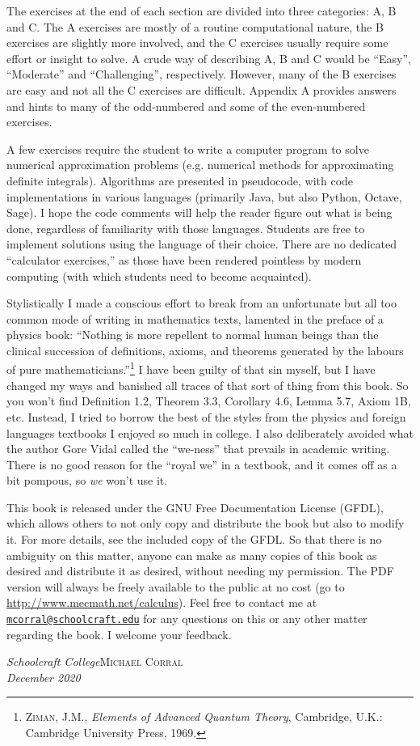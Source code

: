 The exercises at the end of each section are divided into three categories: A, B
and C. The A exercises are mostly of a routine computational nature, the B
exercises are slightly more involved, and the C exercises usually require some
effort or insight to solve. A crude way of describing A, B and C would be
``Easy'', ``Moderate'' and ``Challenging'', respectively. However, many of the B
exercises are easy and not all the C exercises are difficult.  Appendix A
provides answers and hints to many of the odd-numbered and some of the
even-numbered exercises.

A few exercises require the student to write a computer program to solve
numerical approximation problems (e.g. numerical methods for approximating
definite integrals). Algorithms are presented in pseudocode, with code
implementations in various languages (primarily Java, but also Python,
Octave, Sage). I hope the code comments will help the reader figure out what is
being done, regardless of familiarity with those languages. Students are free to
implement solutions using the language of their choice. There are no dedicated
``calculator exercises,'' as those have been rendered pointless by modern
computing (with which students need to become acquainted).

Stylistically I made a conscious effort to break from an unfortunate but all too
common mode of writing in mathematics texts, lamented in the preface of a
physics book: ``Nothing is more repellent to normal human beings than the
clinical succession of definitions, axioms, and theorems generated by the
labours of pure mathematicians.''\footnote{\textsc{Ziman, J.M.},
\emph{Elements of Advanced Quantum Theory}, Cambridge, U.K.: Cambridge
University Press, 1969.} I have been guilty of that sin myself, but I have
changed my ways and banished all traces of that sort of thing from this book. So
you won't find Definition 1.2, Theorem 3.3, Corollary 4.6, Lemma 5.7, Axiom 1B,
etc. Instead, I tried to borrow the best of the styles from the physics and
foreign languages textbooks I enjoyed so much in college. I also deliberately
avoided what the author Gore Vidal called the ``we-ness'' that
prevails in academic writing. There is no good reason for the ``royal we'' in a
textbook, and it comes off as a bit pompous, so \emph{we} won't use it.

This book is released under the GNU Free Documentation License (GFDL), which
allows others to not only copy and distribute the book but also to modify it.
For more details, see the included copy of the GFDL. So that there is no
ambiguity on this matter, anyone can make as many copies of this book as desired
and distribute it as desired, without needing my permission. The PDF version
will always be freely available to the public at no cost (go
to \url{http://www.mecmath.net/calculus}). Feel free to contact me at
\texttt{\href{mailto:mcorral@schoolcraft.edu}{mcorral@schoolcraft.edu}} for any
questions on this or any other matter regarding the book. I welcome your
feedback.

\begin{flushleft}
\emph{Schoolcraft College}\textsc{Michael Corral}\\
\emph{December 2020}
\end{flushleft}
